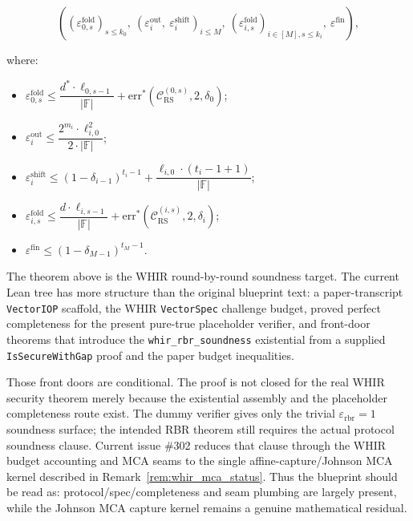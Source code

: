 \begin{theorem}
    \[
((\varepsilon_{0,s}^{\mathrm{fold}})_{s \leq k_0},\ (\varepsilon_i^{\mathrm{out}},\ \varepsilon_i^{\mathrm{shift}})_{i \leq M},\ (\varepsilon_{i,s}^{\mathrm{fold}})_{i \in [M], s \leq k_i},\ \varepsilon^{\mathrm{fin}}),
\]

{where:}

\begin{itemize}
    \item $\varepsilon_{0,s}^{\mathrm{fold}} \leq \dfrac{d^* \cdot \ell_{0,s-1}}{|\mathbb{F}|} + \mathrm{err}^*(\mathcal{C}_{\mathrm{RS}}^{(0,s)}, 2, \delta_0)$;
    \item $\varepsilon_i^{\mathrm{out}} \leq \dfrac{2^{m_i} \cdot \ell_{i,0}^2}{2 \cdot |\mathbb{F}|}$;
    \item $\varepsilon_i^{\mathrm{shift}} \leq (1 - \delta_{i-1})^{t_i - 1} + \dfrac{\ell_{i,0} \cdot (t_i - 1 + 1)}{|\mathbb{F}|}$;
    \item $\varepsilon_{i,s}^{\mathrm{fold}} \leq \dfrac{d \cdot \ell_{i,s-1}}{|\mathbb{F}|} + \mathrm{err}^*(\mathcal{C}_{\mathrm{RS}}^{(i,s)}, 2, \delta_i)$;
    \item $\varepsilon^{\mathrm{fin}} \leq (1 - \delta_{M-1})^{t_M - 1}$.
\end{itemize}
\end{theorem}

\begin{remark}\label{rem:whir_rbr_status}
The theorem above is the WHIR round-by-round soundness target.  The current
Lean tree has more structure than the original blueprint text: a paper-transcript
\texttt{VectorIOP} scaffold, the WHIR \texttt{VectorSpec} challenge budget,
proved perfect completeness for the present pure-true placeholder verifier, and
front-door theorems that introduce the \texttt{whir\_rbr\_soundness}
existential from a supplied \texttt{IsSecureWithGap} proof and the paper budget
inequalities.

Those front doors are conditional.  The proof is not closed for the real WHIR
security theorem merely because the existential assembly and the placeholder
completeness route exist.  The dummy verifier gives only the trivial
\(\varepsilon_{\mathrm{rbr}}=1\) soundness surface; the intended RBR theorem
still requires the actual protocol soundness clause.  Current issue \#302
reduces that clause through the WHIR budget accounting and MCA seams to the
single affine-capture/Johnson MCA kernel described in
Remark~\ref{rem:whir_mca_status}.  Thus the blueprint should be read as:
protocol/spec/completeness and seam plumbing are largely present, while the
Johnson MCA capture kernel remains a genuine mathematical residual.
\end{remark}

